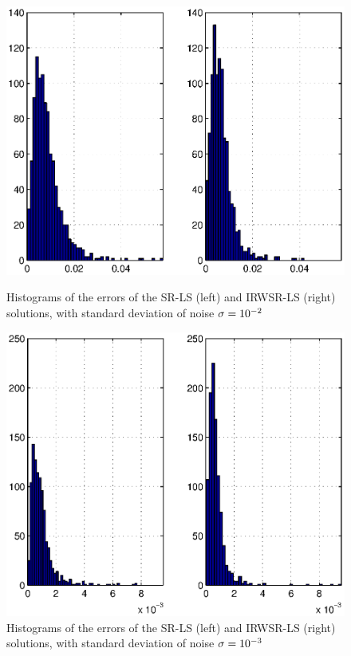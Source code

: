 
\begin{figure}
\centering
\includegraphics[width=1\textwidth,height=0.42\textheight]{figures/range_dif_IRWLS/Noise02LeftBeckRightRD}%
\caption{Histograms of the errors of the SR-LS (left) and IRWSR-LS (right) solutions, with standard deviation of noise  $\protect\sigma = 10^{-2}$}
\label{fig:Noise02IRDW}
\centering
\includegraphics[width=1\textwidth,height=0.42\textheight]{figures/range_dif_IRWLS/Noise03LeftBeckRightRD}%
\caption{Histograms of the errors of the SR-LS (left) and IRWSR-LS (right) solutions, with standard deviation of noise  $\protect\sigma = 10^{-3}$}
\label{fig:Noise03IRDW}
\end{figure}

